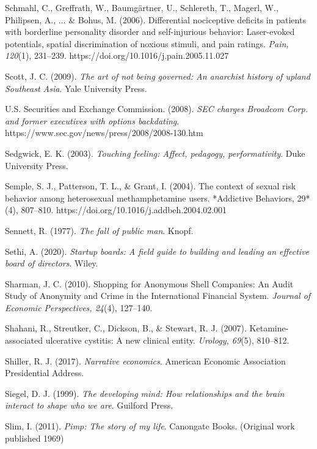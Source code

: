 \begin{thebibliography}{}
    Schmahl, C., Greffrath, W., Baumgärtner, U., Schlereth, T., Magerl, W., Philipsen, A., ... \& Bohus, M. (2006). Differential nociceptive deficits in patients with borderline personality disorder and self-injurious behavior: Laser-evoked potentials, spatial discrimination of noxious stimuli, and pain ratings. \textit{Pain, 120}(1), 231–239. https://doi.org/10.1016/j.pain.2005.11.027

    Scott, J. C. (2009). \textit{The art of not being governed: An anarchist history of upland Southeast Asia}. Yale University Press.
    
    U.S. Securities and Exchange Commission. (2008). \textit{SEC charges Broadcom Corp. and former executives with options backdating}. https://www.sec.gov/news/press/2008/2008-130.htm

    Sedgwick, E. K. (2003). \textit{Touching feeling: Affect, pedagogy, performativity}. Duke University Press.

    Semple, S. J., Patterson, T. L., \& Grant, I. (2004). The context of sexual risk behavior among heterosexual methamphetamine users. *Addictive Behaviors, 29*(4), 807–810. https://doi.org/10.1016/j.addbeh.2004.02.001

    Sennett, R. (1977). \textit{The fall of public man}. Knopf.

    Sethi, A. (2020). \textit{Startup boards: A field guide to building and leading an effective board of directors}. Wiley.


    Sharman, J. C. (2010). Shopping for Anonymous Shell Companies: An Audit Study of Anonymity and Crime in the International Financial System. \textit{Journal of Economic Perspectives, 24}(4), 127–140.

    Shahani, R., Streutker, C., Dickson, B., \& Stewart, R. J. (2007). Ketamine-associated ulcerative cystitis: A new clinical entity. \textit{Urology, 69}(5), 810–812.

    Shiller, R. J. (2017). \textit{Narrative economics}. American Economic Association Presidential Address.

    Siegel, D. J. (1999). \textit{The developing mind: How relationships and the brain interact to shape who we are}. Guilford Press.

    Slim, I. (2011). \textit{Pimp: The story of my life}. Canongate Books. (Original work published 1969)


\end{thebibliography}
